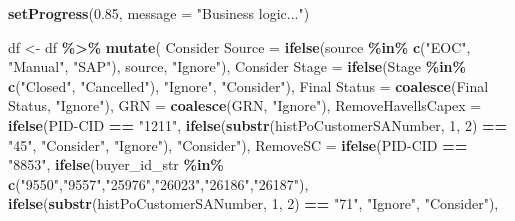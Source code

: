 \documentclass[
]{article}
\newenvironment{Shaded}{\begin{snugshade}}{\end{snugshade}}
\newcommand{\AttributeTok}[1]{\textcolor[rgb]{0.13,0.29,0.53}{#1}}
\newcommand{\DecValTok}[1]{\textcolor[rgb]{0.00,0.00,0.81}{#1}}
\newcommand{\FloatTok}[1]{\textcolor[rgb]{0.00,0.00,0.81}{#1}}
\newcommand{\FunctionTok}[1]{\textcolor[rgb]{0.13,0.29,0.53}{\textbf{#1}}}
\newcommand{\NormalTok}[1]{#1}
\newcommand{\OtherTok}[1]{\textcolor[rgb]{0.56,0.35,0.01}{#1}}
\newcommand{\SpecialCharTok}[1]{\textcolor[rgb]{0.81,0.36,0.00}{\textbf{#1}}}
\newcommand{\StringTok}[1]{\textcolor[rgb]{0.31,0.60,0.02}{#1}}
\begin{document}
\begin{Shaded}
\begin{Highlighting}[]
        \FunctionTok{setProgress}\NormalTok{(}\FloatTok{0.85}\NormalTok{, }\AttributeTok{message =} \StringTok{"Business logic..."}\NormalTok{)}
        
\NormalTok{        df }\OtherTok{\textless{}{-}}\NormalTok{ df }\SpecialCharTok{\%\textgreater{}\%} \FunctionTok{mutate}\NormalTok{(}
          \StringTok{\textasciigrave{}}\AttributeTok{Consider Source}\StringTok{\textasciigrave{}}  \OtherTok{=} \FunctionTok{ifelse}\NormalTok{(source }\SpecialCharTok{\%in\%} \FunctionTok{c}\NormalTok{(}\StringTok{"EOC"}\NormalTok{, }\StringTok{"Manual"}\NormalTok{, }\StringTok{"SAP"}\NormalTok{), source, }\StringTok{"Ignore"}\NormalTok{),}
          \StringTok{\textasciigrave{}}\AttributeTok{Consider Stage}\StringTok{\textasciigrave{}}   \OtherTok{=} \FunctionTok{ifelse}\NormalTok{(Stage  }\SpecialCharTok{\%in\%} \FunctionTok{c}\NormalTok{(}\StringTok{"Closed"}\NormalTok{, }\StringTok{"Cancelled"}\NormalTok{), }\StringTok{"Ignore"}\NormalTok{, }\StringTok{"Consider"}\NormalTok{),}
          \StringTok{\textasciigrave{}}\AttributeTok{Final Status}\StringTok{\textasciigrave{}}     \OtherTok{=} \FunctionTok{coalesce}\NormalTok{(}\StringTok{\textasciigrave{}}\AttributeTok{Final Status}\StringTok{\textasciigrave{}}\NormalTok{, }\StringTok{"Ignore"}\NormalTok{),}
          \AttributeTok{GRN                =} \FunctionTok{coalesce}\NormalTok{(GRN, }\StringTok{"Ignore"}\NormalTok{),}
          \AttributeTok{RemoveHavellsCapex =} \FunctionTok{ifelse}\NormalTok{(}\StringTok{\textasciigrave{}}\AttributeTok{PID{-}CID}\StringTok{\textasciigrave{}} \SpecialCharTok{==} \StringTok{"1211"}\NormalTok{,}
                                      \FunctionTok{ifelse}\NormalTok{(}\FunctionTok{substr}\NormalTok{(histPoCustomerSANumber, }\DecValTok{1}\NormalTok{, }\DecValTok{2}\NormalTok{) }\SpecialCharTok{==} \StringTok{"45"}\NormalTok{, }\StringTok{"Consider"}\NormalTok{, }\StringTok{"Ignore"}\NormalTok{),}
                                      \StringTok{"Consider"}\NormalTok{),}
          \AttributeTok{RemoveSC           =} \FunctionTok{ifelse}\NormalTok{(}\StringTok{\textasciigrave{}}\AttributeTok{PID{-}CID}\StringTok{\textasciigrave{}} \SpecialCharTok{==} \StringTok{"8853"}\NormalTok{,}
                                      \FunctionTok{ifelse}\NormalTok{(buyer\_id\_str }\SpecialCharTok{\%in\%} \FunctionTok{c}\NormalTok{(}\StringTok{"9550"}\NormalTok{,}\StringTok{"9557"}\NormalTok{,}\StringTok{"25976"}\NormalTok{,}\StringTok{"26023"}\NormalTok{,}\StringTok{"26186"}\NormalTok{,}\StringTok{"26187"}\NormalTok{),}
                                             \FunctionTok{ifelse}\NormalTok{(}\FunctionTok{substr}\NormalTok{(histPoCustomerSANumber, }\DecValTok{1}\NormalTok{, }\DecValTok{2}\NormalTok{) }\SpecialCharTok{==} \StringTok{"71"}\NormalTok{, }\StringTok{"Ignore"}\NormalTok{, }\StringTok{"Consider"}\NormalTok{),}

\end{Highlighting}
\end{Shaded}
\end{document}
